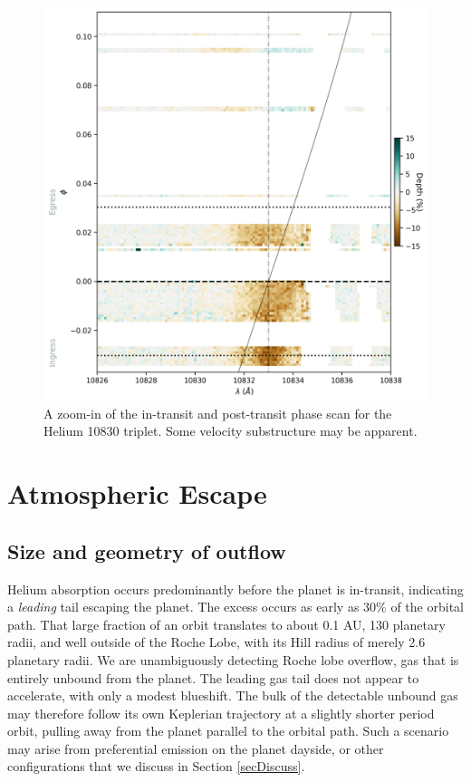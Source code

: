 \documentclass[twocolumn]{aastex631}
\begin{document}
\begin{figure}
    \includegraphics[width=\linewidth]{figures/phase_2D_diagram_zoom.png}
    \caption{A zoom-in of the in-transit and post-transit phase scan for the Helium 10830 triplet.  Some velocity substructure may be apparent.}
    \label{fig:HeliumScanZoom}
\end{figure}


\section{Atmospheric Escape}

\subsection{Size and geometry of outflow}
Helium absorption occurs predominantly before the planet is in-transit, indicating a \emph{leading} tail escaping the planet.  The excess occurs as early as 30\% of the orbital path.  That large fraction of an orbit translates to about 0.1 AU, 130 planetary radii, and well outside of the Roche Lobe, with its Hill radius of merely 2.6 planetary radii.  We are unambiguously detecting Roche lobe overflow, gas that is entirely unbound from the planet.  The leading gas tail does not appear to accelerate, with only a modest blueshift.  The bulk of the detectable unbound gas may therefore follow its own Keplerian trajectory at a slightly shorter period orbit, pulling away from the planet parallel to the orbital path.  Such a scenario may arise from preferential emission on the planet dayside, or other configurations that we discuss in Section \ref{secDiscuss}.
\end{document}

